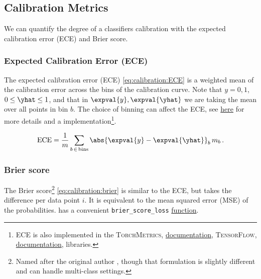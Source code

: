\subsection{Calibration Metrics}
\label{ml_general:calibration:calibration_metrics}

We can quantify the degree of a classifiers calibration with the
expected calibration error (ECE) and Brier score.

\subsubsection{Expected Calibration Error (ECE)}
\label{ml_general:calibration:ECE}

The expected calibration error (ECE) \cite{pmid25927013} \cref{eq:calibration:ECE}
is a weighted mean of the calibration error
across the bins of the calibration curve.
Note that $y=0,1$, $0 \leq \yhat \leq 1$,
and that in $\expval{y}, \expval{\yhat}$ we are taking the mean over all points in bin $b$.
The choice of binning can affect the ECE,
see \href{https://towardsdatascience.com/pythons-predict-proba-doesn-t-actually-predict-probabilities-and-how-to-fix-it-f582c21d63fc}{here} for
more details and a \python implementation\footnote{ECE is also implemented in
the \textsc{TorchMetrics}, \href{https://torchmetrics.readthedocs.io/en/stable/classification/calibration_error.html}{documentation},
\textsc{TensorFlow}, \href{https://www.tensorflow.org/probability/api_docs/python/tfp/stats/expected_calibration_error}{documentation},
libraries.}.

\begin{equation} \label{eq:calibration:ECE}
\text{ECE} = \frac{1}{m} \sum_{b \,\in\, \text{bins}} \abs{\expval{y} - \expval{\yhat}}_{b} \, m_{b} \, .
\end{equation}

\subsubsection{Brier score}
\label{ml_general:calibration:brier_score}

The Brier score\footnote{Named after the original author \cite{brier},
though that formulation is slightly different and can handle multi-class settings.} \cref{eq:calibration:brier} is
similar to the ECE, but takes the difference per data point $i$.
It is equivalent to the mean squared error (MSE) of the probabilities.
\sklearn has a convenient \texttt{brier\_score\_loss}
\href{https://scikit-learn.org/stable/modules/generated/sklearn.metrics.brier_score_loss.html}{function}.


